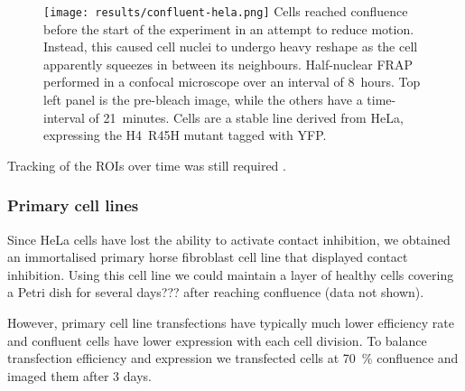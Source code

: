       \begin{figure}
        \centering
        \texttt{[image: results/confluent-hela.png]}
          {
            Cells reached confluence before the start of the
            experiment in an attempt to reduce motion. Instead, this caused
            cell nuclei to undergo heavy reshape as the cell apparently
            squeezes in between its neighbours. Half-nuclear FRAP performed in
            a confocal microscope over an interval of 8~hours. Top left panel
            is the pre-bleach image, while the others have a time-interval of
            21~minutes. Cells are a stable line derived from HeLa, expressing
            the H4~R45H mutant tagged with YFP.
          }
        \label{fig:kill-frap:confluent-hela}
      \end{figure}

      Tracking of the ROIs over time was still required .

    \subsubsection{Primary cell lines}

      Since HeLa cells have lost the ability to activate contact inhibition,
      we obtained an immortalised primary horse fibroblast cell line
      that displayed contact inhibition. Using this cell line we could
      maintain a layer of healthy cells covering a Petri dish for several days???
      after reaching confluence (data not shown).

      However, primary cell line transfections have typically much lower efficiency rate and
      confluent cells have lower expression with each cell division.
      To balance transfection efficiency and expression we transfected cells at
      \SI{70}{\percent} confluence and imaged them after 3 days.

